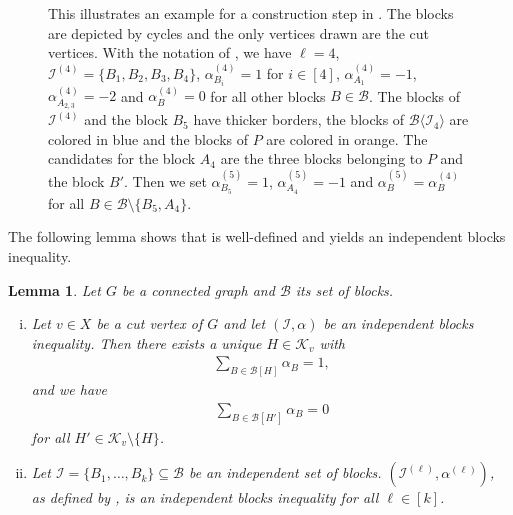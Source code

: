 \documentclass[12pt]{amsart}
\newtheorem{lemma}[theorem]{Lemma}
\newcommand{\K}{\mathcal{K}}
\newcommand{\I}{\mathcal{I}}
\newcommand{\B}{\mathcal{B}}
\begin{document}
\begin{figure}
    \caption{This illustrates an example for a construction step in . The blocks are depicted by cycles and the only vertices drawn are the cut vertices. With the notation of , we have $\ell=4$, $\I^{(4)}=\{B_1,B_2,B_3,B_4\}$, $\alpha^{(4)}_{B_i}=1$ for $i\in[4]$, $\alpha^{(4)}_{A_1}=-1$, $\alpha^{(4)}_{A_{2,3}}=-2$ and $\alpha^{(4)}_B=0$ for all other blocks $B \in \B$. The blocks of $\I^{(4)}$ and the block $B_5$ have thicker borders, the blocks of $\B\langle\I_4\rangle$ are colored in blue and the blocks of $P$ are colored in orange. The candidates for the block $A_4$ are the three blocks belonging to $P$ and the block $B'$. Then we set $\alpha^{(5)}_{B_5}=1$, $\alpha^{(5)}_{A_4}=-1$ and $\alpha^{(5)}_{B}=\alpha^{(4)}_B$ for all $B \in \B \setminus \{B_5,A_4\}$.}
    \label{fig:Construction}
\end{figure}

The following lemma shows that  is well-defined and yields an independent blocks inequality.

\begin{lemma}
\label{weight1}
Let $G$ be a connected graph and $\B$ its set of blocks.
\begin{enumerate}[(i)]
    \item Let $v \in X$ be a cut vertex of $G$ and let $(\I,\alpha)$ be an independent blocks inequality. Then there exists a unique $H \in \K_v$ with
    \begin{align*}
        \sum_{B \in \B[H]}\alpha_B=1,
    \end{align*}
    and we have
    \begin{align*}
        \sum_{B \in \B[H']}\alpha_B=0
    \end{align*}
    for all $H' \in \K_v \setminus \{H\}$.
    \item Let $\I=\{B_1,\ldots,B_k\} \subseteq \B$ be an independent set of blocks. $(\I^{(\ell)},\alpha^{(\ell)})$, as defined by , is an independent blocks inequality for all $\ell \in [k]$.
\end{enumerate}
\end{lemma}
\end{document}
